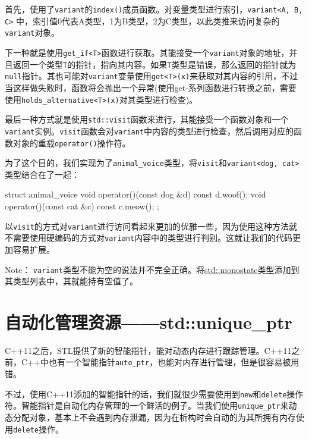 首先，使用了\texttt{variant}的\texttt{index()}成员函数。对变量类型进行索引，\texttt{variant<A, B, C>} 中，索引值0代表A类型，1为B类型，2为C类型，以此类推来访问复杂的\texttt{variant}对象。

下一种就是使用\texttt{get\_if<T>}函数进行获取。其能接受一个\texttt{variant}对象的地址，并且返回一个类型\texttt{T}的指针，指向其内容。如果\texttt{T}类型是错误，那么返回的指针就为\texttt{null}指针。其也可能对\texttt{variant}变量使用\texttt{get<T>(x)}来获取对其内容的引用，不过当这样做失败时，函数将会抛出一个异常(使用get-系列函数进行转换之前，需要使用\texttt{holds\_alternative<T>(x)}对其类型进行检查)。

最后一种方式就是使用\texttt{std::visit}函数来进行，其能接受一个函数对象和一个\texttt{variant}实例。\texttt{visit}函数会对\texttt{variant}中内容的类型进行检查，然后调用对应的函数对象的重载\texttt{operator()}操作符。

为了这个目的，我们实现为了\texttt{animal\_voice}类型，将\texttt{visit}和\texttt{variant<dog, cat>}类型结合在了一起：

\begin{codebox}[cpp]
struct animal_voice
{
    void operator()(const dog &d) const { d.woof(); }
    void operator()(const cat &c) const { c.meow(); }
};
\end{codebox}

以\texttt{visit}的方式对\texttt{variant}进行访问看起来更加的优雅一些，因为使用这种方法就不需要使用硬编码的方式对\texttt{variant}内容中的类型进行判别。这就让我们的代码更加容易扩展。

\begin{myInfoBox}
Note： \texttt{variant}类型不能为空的说法并不完全正确。将\href{http://zh.cppreference.com/w/cpp/utility/variant/monostate}{std::monostate}类型添加到其类型列表中，其就能持有空值了。
\end{myInfoBox}


\section{自动化管理资源——std::unique\_ptr}

C++11之后，STL提供了新的智能指针，能对动态内存进行跟踪管理。C++11之前，C++中也有一个智能指针\texttt{auto\_ptr}，也能对内存进行管理，但是很容易被用错。

不过，使用C++11添加的智能指针的话，我们就很少需要使用到\texttt{new}和\texttt{delete}操作符。智能指针是自动化内存管理的一个鲜活的例子。当我们使用\texttt{unique\_ptr}来动态分配对象，基本上不会遇到内存泄漏，因为在析构时会自动的为其所拥有内存使用\texttt{delete}操作。

